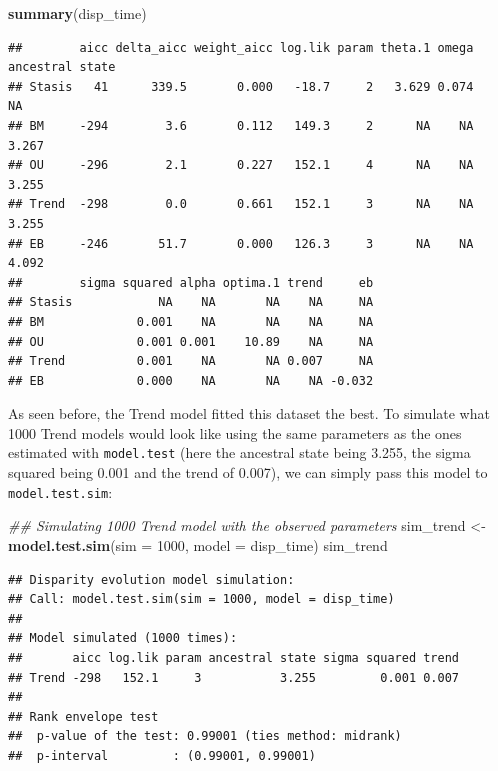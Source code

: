 \documentclass[
]{book}
\newenvironment{Shaded}{\begin{snugshade}}{\end{snugshade}}
\newcommand{\CommentTok}[1]{\textcolor[rgb]{0.56,0.35,0.01}{\textit{#1}}}
\newcommand{\DataTypeTok}[1]{\textcolor[rgb]{0.13,0.29,0.53}{#1}}
\newcommand{\DecValTok}[1]{\textcolor[rgb]{0.00,0.00,0.81}{#1}}
\newcommand{\KeywordTok}[1]{\textcolor[rgb]{0.13,0.29,0.53}{\textbf{#1}}}
\newcommand{\NormalTok}[1]{#1}
\newcommand{\StringTok}[1]{\textcolor[rgb]{0.31,0.60,0.02}{#1}}
\begin{document}
\begin{Shaded}
\begin{Highlighting}[]
\KeywordTok{summary}\NormalTok{(disp\_time)}
\end{Highlighting}
\end{Shaded}

\begin{verbatim}
##        aicc delta_aicc weight_aicc log.lik param theta.1 omega ancestral state
## Stasis   41      339.5       0.000   -18.7     2   3.629 0.074              NA
## BM     -294        3.6       0.112   149.3     2      NA    NA           3.267
## OU     -296        2.1       0.227   152.1     4      NA    NA           3.255
## Trend  -298        0.0       0.661   152.1     3      NA    NA           3.255
## EB     -246       51.7       0.000   126.3     3      NA    NA           4.092
##        sigma squared alpha optima.1 trend     eb
## Stasis            NA    NA       NA    NA     NA
## BM             0.001    NA       NA    NA     NA
## OU             0.001 0.001    10.89    NA     NA
## Trend          0.001    NA       NA 0.007     NA
## EB             0.000    NA       NA    NA -0.032
\end{verbatim}

As seen before, the Trend model fitted this dataset the best.
To simulate what 1000 Trend models would look like using the same parameters as the ones estimated with \texttt{model.test} (here the ancestral state being 3.255, the sigma squared being 0.001 and the trend of 0.007), we can simply pass this model to \texttt{model.test.sim}:

\begin{Shaded}
\begin{Highlighting}[]
\CommentTok{\#\# Simulating 1000 Trend model with the observed parameters}
\NormalTok{sim\_trend \textless{}{-}}\StringTok{ }\KeywordTok{model.test.sim}\NormalTok{(}\DataTypeTok{sim =} \DecValTok{1000}\NormalTok{, }\DataTypeTok{model =}\NormalTok{ disp\_time)}
\NormalTok{sim\_trend}
\end{Highlighting}
\end{Shaded}

\begin{verbatim}
## Disparity evolution model simulation:
## Call: model.test.sim(sim = 1000, model = disp_time) 
## 
## Model simulated (1000 times):
##       aicc log.lik param ancestral state sigma squared trend
## Trend -298   152.1     3           3.255         0.001 0.007
## 
## Rank envelope test
##  p-value of the test: 0.99001 (ties method: midrank)
##  p-interval         : (0.99001, 0.99001)
\end{verbatim}
\end{document}
